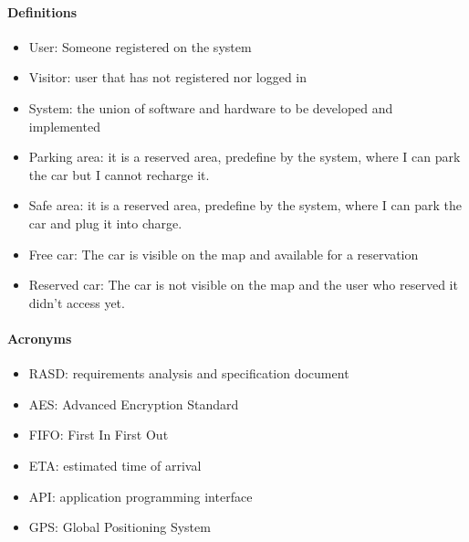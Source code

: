 \paragraph{Definitions}
\begin{itemize}
	\item User: Someone registered on the system
	\item Visitor: user that has not registered nor logged in
	\item System: the union of software and hardware to be developed and implemented
	\item Parking area: it is a reserved area, predefine by the system, where I can park the car but I cannot recharge it.
	\item Safe area: it is a reserved area, predefine by the system, where I can park the car and plug it into charge.
	\item Free car: The car is visible on the map and available for a reservation
	\item Reserved car: The car is not visible on the map and the user who reserved it didn't access yet.
\end{itemize}
\paragraph{Acronyms}
\begin{itemize}
	\item RASD: requirements analysis and specification document
	\item AES: Advanced Encryption Standard
	\item FIFO: First In First Out
	\item ETA: estimated time of arrival
	\item API: application programming interface
	\item GPS: Global Positioning System
\end{itemize}